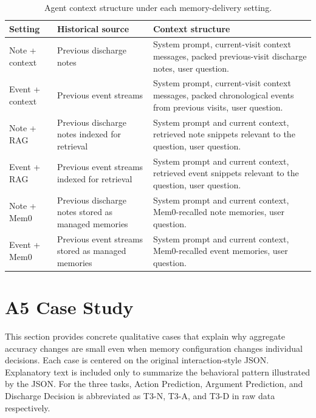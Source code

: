 \begin{table}[!h]
    \centering
    \caption{Agent context structure under each memory-delivery setting.}
    \label{tab:appendix_agent_config}
    {\fontsize{8}{9.2}\selectfont
    \setlength{\tabcolsep}{3pt}
    \renewcommand{\arraystretch}{1.15}
    \begin{tabular*}{\textwidth}{p{}@{\extracolsep{\fill}}p{}p{}}
        \toprule
        \textbf{Setting} & \textbf{Historical source} & \textbf{Context structure} \\
        \midrule
        Note + context & Previous discharge notes & System prompt, current-visit context messages, packed previous-visit discharge notes, user question. \\
        Event + context & Previous event streams & System prompt, current-visit context messages, packed chronological events from previous visits, user question. \\
        Note + RAG & Previous discharge notes indexed for retrieval & System prompt and current context, retrieved note snippets relevant to the question, user question. \\
        Event + RAG & Previous event streams indexed for retrieval & System prompt and current context, retrieved event snippets relevant to the question, user question. \\
        Note + Mem0 & Previous discharge notes stored as managed memories & System prompt and current context, Mem0-recalled note memories, user question. \\
        Event + Mem0 & Previous event streams stored as managed memories & System prompt and current context, Mem0-recalled event memories, user question. \\
        \bottomrule
    \end{tabular*}}
\end{table}

\section*{A5 Case Study}

This section provides concrete qualitative cases that explain why aggregate accuracy changes are small even when memory configuration changes individual decisions. Each case is centered on the original interaction-style JSON. Explanatory text is included only to summarize the behavioral pattern illustrated by the JSON. For the three tasks, Action Prediction, Argument Prediction, and Discharge Decision is abbreviated as T3-N, T3-A, and T3-D in raw data respectively.


